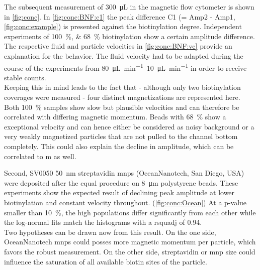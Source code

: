 The subsequent measurement of \SI{300}{\micro\liter} in the magnetic flow cytometer is shown in \cref{fig:conc}. In \cref{fig:conc:BNF:c1} the peak difference C1 (= Amp2 - Amp1, \cref{fig:conc:example}) is presented against the biotinylation degree. Independent experiments of \SIlist{100;68}{\percent} biotinylation show a certain amplitude difference. The respective fluid and particle velocities in \cref{fig:conc:BNF:vc} provide an explanation for the behavior. The fluid velocity had to be adapted during the course of the experiments from \SIrange{80}{10}{\micro\liter\per\minute} in order to receive stable counts.\\
Keeping this in mind leads to the fact that - although only two biotinylation coverages were measured - four distinct magnetizations are represented here. Both \SI{100}{\percent} samples show slow but plausible velocities and can therefore be correlated with differing magnetic momentum. Beads with \SI{68}{\percent} show a exceptional velocity and can hence either be considered as noisy background or a very weakly magnetized particles that are not pulled to the channel bottom completely. This could also explain the decline in amplitude, which can be correlated to \acrlong{m} as well.

Second, SV0050 \SI{50}{\nano\meter} streptavidin \glspl{mnp} (OceanNanotech, San Diego, USA) were deposited after the equal procedure on \SI{8}{\micro\meter} polystyrene beads. These experiments show the expected result of declining peak amplitude at lower biotinylation and constant velocity throughout. (\cref{fig:conc:Ocean}) At a p-value smaller than \SI{10}{\percent}, the high populations differ significantly from each other while the log-normal fits match the histograms with a \gls{rsquadj} of \num{0.94}.\\
Two hypotheses can be drawn now from this result. On the one side, OceanNanotech \glspl{mnp} could posses more magnetic momentum per particle, which favors the robust measurement. On the other side, streptavidin or \gls{mnp} size could influence the saturation of all available biotin sites of the particle. 




